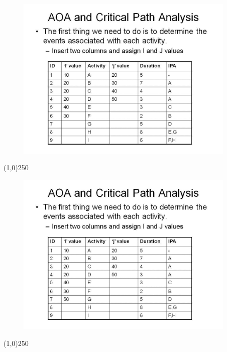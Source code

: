 \begin{frame}
\begin{figure}
	\centering
		\includegraphics[width = 10.5cm]{oldnotes/Slide69.jpg}
\end{figure}
\end{frame}
\begin{center}\line(1,0){250}\end{center}


\begin{frame}
\begin{figure}
	\centering
		\includegraphics[width = 10.5cm]{oldnotes/Slide70.jpg}
\end{figure}
\end{frame}
\begin{center}\line(1,0){250}\end{center}


